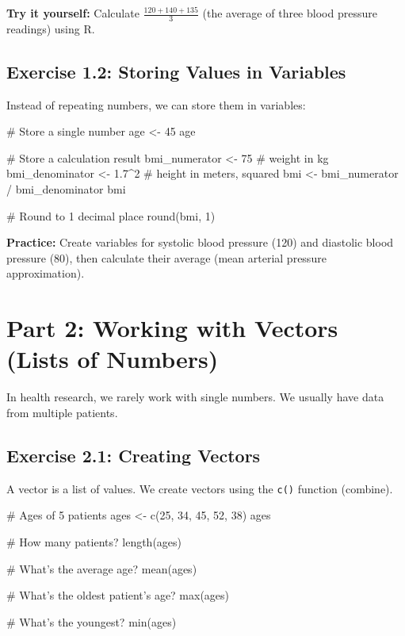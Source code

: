 \documentclass[11pt]{article}
\begin{document}
\textbf{Try it yourself:} Calculate $\frac{120 + 140 + 135}{3}$ (the average of three blood pressure readings) using R.

\vspace{2cm}

\subsection{Exercise 1.2: Storing Values in Variables}

Instead of repeating numbers, we can store them in variables:

\begin{rcode}
# Store a single number
age <- 45
age

# Store a calculation result
bmi_numerator <- 75  # weight in kg
bmi_denominator <- 1.7^2  # height in meters, squared
bmi <- bmi_numerator / bmi_denominator
bmi

# Round to 1 decimal place
round(bmi, 1)
\end{rcode}

\textbf{Practice:} Create variables for systolic blood pressure (120) and diastolic blood pressure (80), then calculate their average (mean arterial pressure approximation).

\vspace{2cm}

\section{Part 2: Working with Vectors (Lists of Numbers)}

In health research, we rarely work with single numbers. We usually have data from multiple patients.

\subsection{Exercise 2.1: Creating Vectors}

A vector is a list of values. We create vectors using the \texttt{c()} function (combine).

\begin{rcode}
# Ages of 5 patients
ages <- c(25, 34, 45, 52, 38)
ages

# How many patients?
length(ages)

# What's the average age?
mean(ages)

# What's the oldest patient's age?
max(ages)

# What's the youngest?
min(ages)
\end{rcode}
\end{document}
